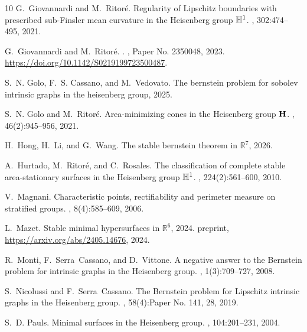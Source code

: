 \documentclass[11pt]{amsart}
\newcommand{\rr}{{\mathbb{R}}}
\theoremstyle{definition}
\theoremstyle{remark}
\numberwithin{equation}{section}
\begin{document}
\begin{thebibliography}{10}
G.~Giovannardi and M.~Ritor\'{e}.
\newblock Regularity of {L}ipschitz boundaries with prescribed sub-{F}insler mean curvature in the {H}eisenberg group {$\Bbb H^1$}.
, 302:474--495, 2021.

G.~Giovannardi and M.~Ritor\'{e}.
.
, Paper No. 2350048, 2023.
\newblock \url{https://doi.org/10.1142/S0219199723500487}.

S.~N. Golo, F.~S. Cassano, and M.~Vedovato.
\newblock The bernstein problem for sobolev intrinsic graphs in the heisenberg group, 2025.

S.~N. Golo and M.~Ritor\'{e}.
\newblock Area-minimizing cones in the {H}eisenberg group {${\bf H}$}.
, 46(2):945--956, 2021.

H.~Hong, H.~Li, and G.~Wang.
\newblock The stable bernstein theorem in $\mathbb{R}^{7}$, 2026.

A.~Hurtado, M.~Ritor\'{e}, and C.~Rosales.
\newblock The classification of complete stable area-stationary surfaces in the {H}eisenberg group {$\Bbb H^1$}.
, 224(2):561--600, 2010.

V.~Magnani.
\newblock Characteristic points, rectifiability and perimeter measure on stratified groups.
, 8(4):585--609, 2006.

L.~Mazet.
\newblock Stable minimal hypersurfaces in $\rr^6$, 2024.
\newblock preprint, \url{https://arxiv.org/abs/2405.14676}, 2024.

R.~Monti, F.~Serra~Cassano, and D.~Vittone.
\newblock A negative answer to the {B}ernstein problem for intrinsic graphs in the {H}eisenberg group.
, 1(3):709--727, 2008.

S.~Nicolussi and F.~Serra~Cassano.
\newblock The {B}ernstein problem for {L}ipschitz intrinsic graphs in the {H}eisenberg group.
, 58(4):Paper No. 141, 28, 2019.

S.~D. Pauls.
\newblock Minimal surfaces in the {H}eisenberg group.
, 104:201--231, 2004.


\end{thebibliography}
\end{document}
